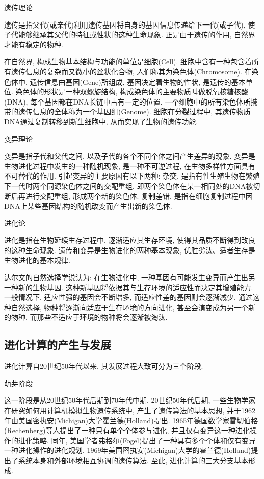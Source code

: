    遗传理论

  遗传是指父代(或亲代)利用遗传基因将自身的基因信息传递给下一代(或子代), 使子代能够继承其父代的特征或性状的这种生命现象. 正是由于遗传的作用, 自然界才能有稳定的物种.

  在自然界, 构成生物基本结构与功能的单位是细胞(Cell). 细胞中含有一种包含着所有遗传信息的复杂而又微小的丝状化合物, 人们称其为染色体(Chromosome).
  在染色体中, 遗传信息由基因(Gene)所组成, 基因决定着生物的性状, 是遗传的基本单位.
   染色体的形状是一种双螺旋结构, 构成染色体的主要物质叫做脱氧核糖核酸(DNA), 每个基因都在DNA长链中占有一定的位置.
   一个细胞中的所有染色体所携带的遗传信息的全体称为一个基因组(Genome).
   细胞在分裂过程中, 其遗传物质DNA通过复制转移到新生细胞中, 从而实现了生物的遗传功能.

    变异理论

   变异是指子代和父代之间, 以及子代的各个不同个体之间产生差异的现象. 变异是生物进化过程中发生的一种随机现象, 是一种不可逆过程, 在生物多样性方面具有不可替代的作用. 引起变异的主要原因有以下两种:
   杂交, 是指有性生殖生物在繁殖下一代时两个同源染色体之间的交配重组, 即两个染色体在某一相同处的DNA被切断后再进行交配重组, 形成两个新的染色体. 复制差错, 是指在细胞复制过程中因DNA上某些基因结构的随机改变而产生出新的染色体.

      进化论

    进化是指在生物延续生存过程中, 逐渐适应其生存环境, 使得其品质不断得到改良的这种生命现象. 遗传和变异是生物进化的两种基本现象, 优胜劣汰、适者生存是生物进化的基本规律.

    达尔文的自然选择学说认为: 在生物进化中, 一种基因有可能发生变异而产生出另一种新的生物基因. 这种新基因将依据其与生存环境的适应性而决定其增殖能力. 一般情况下, 适应性强的基因会不断增多, 而适应性差的基因则会逐渐减少. 通过这种自然选择, 物种将逐渐向适应于生存环境的方向进化, 甚至会演变成为另一个新的物种, 而那些不适应于环境的物种将会逐渐被淘汰.
\subsection{进化计算的产生与发展}
 进化计算自20世纪50年代以来, 其发展过程大致可分为三个阶段.

       萌芽阶段

     这一阶段是从20世纪50年代后期到70年代中期. 20世纪50年代后期, 一些生物学家在研究如何用计算机模拟生物遗传系统中, 产生了遗传算法的基本思想, 并于1962年由美国密执安(Michigan)大学霍兰德(Holland)提出. 1965年德国数学家雷切伯格(Rechenberg)等人提出了一种只有单个个体参与进化, 并且仅有变异这一种进化操作的进化策略. 同年, 美国学者弗格尔(Fogel)提出了一种具有多个个体和仅有变异一种进化操作的进化规划. 1969年美国密执安(Michigan)大学的霍兰德(Holland)提出了系统本身和外部环境相互协调的遗传算法. 至此, 进化计算的三大分支基本形成.

